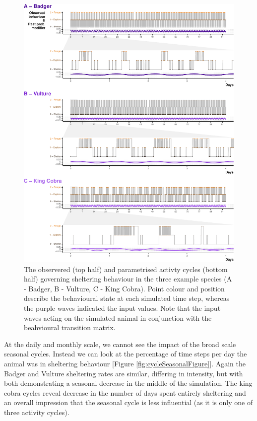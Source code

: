 \documentclass[10pt,a4paper]{article}
\begin{document}
\begin{figure}

{\centering \includegraphics{Agent-based_model_walkthrough_files/figure-latex/cycleFigure-1} 

}

\caption{The observered (top half) and parametrised activty cycles (bottom half) governing sheltering behaviour in the three example species (A - Badger, B - Vulture, C - King Cobra). Point colour and position describe the behavioural state at each simulated time step, whereas the purple waves indicated the input values. Note that the input waves acting on the simulated animal in conjunction with the beahvioural transition matrix.}\label{fig:cycleFigure}
\end{figure}

At the daily and monthly scale, we cannot see the impact of the broad scale seasonal cycles.
Instead we can look at the percentage of time steps per day the animal was in sheltering behaviour {[}Figure \ref{fig:cycleSeasonalFigure}{]}.
Again the Badger and Vulture sheltering rates are similar, differing in intensity, but with both demonstrating a seasonal decrease in the middle of the simulation.
The king cobra cycles reveal decrease in the number of days spent entirely sheltering and an overall impression that the seasonal cycle is less influential (as it is only one of three activity cycles).
\end{document}
